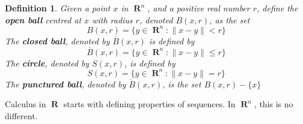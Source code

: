 \documentclass{report}
\newtheorem{definition}{Definition}
\DeclareMathOperator{\real}{\mathbf{R}}
\begin{document}
\begin{definition}
  Given a point $x$ in $\real^n$, and a positive real number $r$, define the {\bf open ball} centred at $x$ with radius $r$, denoted $B(x,r)$, as the set
  \[ B(x,r) = \{ y \in \real^n : \| x - y \| < r \} \]
  The {\bf closed ball}, denoted by $\overline{B}(x,r)$ is defined by
  \[ \overline{B}(x,r) = \{ y \in \real^n : \| x - y \| \leq r \} \]
  The {\bf circle}, denoted by $S(x,r)$, is defined by
  \[ S(x,r) = \{ y \in \real^n : \| x - y \| = r \} \]
  The {\bf punctured ball}, denoted by $\mathring{B}(x,r)$, is the set $B(x,r) - \{x\}$
\end{definition}

Calculus in $\real$ starts with defining properties of sequences. In $\real^n$, this is no different.
\end{document}
